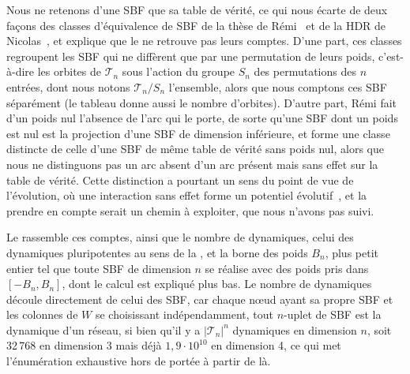 \documentclass[12pt, a4paper]{article}
\begin{document}
Nous ne retenons d'une SBF que sa table de vérité, ce qui nous écarte de deux façons des classes d'équivalence de SBF de la thèse de Rémi~\cite{segretain2023} et de la HDR de Nicolas~\cite{glade2022}, et explique que le  ne retrouve pas leurs comptes.
D'une part, ces classes regroupent les SBF qui ne diffèrent que par une permutation de leurs poids, c'est-à-dire les orbites de $\mathcal{T}_n$ sous l'action du groupe $S_n$ des permutations des $n$ entrées, dont nous notons $\mathcal{T}_n/S_n$ l'ensemble, alors que nous comptons ces SBF séparément (le tableau donne aussi le nombre d'orbites).
D'autre part, Rémi fait d'un poids nul l'absence de l'arc qui le porte, de sorte qu'une SBF dont un poids est nul est la projection d'une SBF de dimension inférieure, et forme une classe distincte de celle d'une SBF de même table de vérité sans poids nul, alors que nous ne distinguons pas un arc absent d'un arc présent mais sans effet sur la table de vérité.
Cette distinction a pourtant un sens du point de vue de l'évolution, où une interaction sans effet forme un potentiel évolutif~\cite{segretain2023}, et la prendre en compte serait un chemin à exploiter, que nous n'avons pas suivi.

Le  rassemble ces comptes, ainsi que le nombre de dynamiques, celui des dynamiques pluripotentes au sens de la , et la borne des poids $B_n$, plus petit entier tel que toute SBF de dimension $n$ se réalise avec des poids pris dans $[-B_n, B_n]$, dont le calcul est expliqué plus bas.
Le nombre de dynamiques découle directement de celui des SBF, car chaque nœud ayant sa propre SBF et les colonnes de $W$ se choisissant indépendamment, tout $n$-uplet de SBF est la dynamique d'un réseau, si bien qu'il y a $|\mathcal{T}_n|^n$ dynamiques en dimension $n$, soit 32\,768 en dimension 3 mais déjà $1{,}9 \cdot 10^{10}$ en dimension 4, ce qui met l'énumération exhaustive hors de portée à partir de là.
\end{document}
